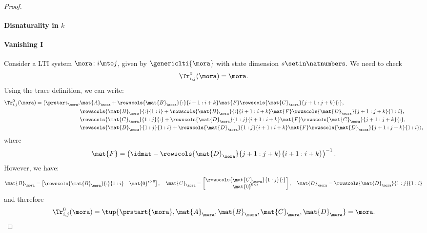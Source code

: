 {\begin{proof}
        \paragraph*{Disnaturality in $k$}

        \paragraph*{Vanishing I}
        Consider a LTI system $\mora\colon i\mto j$, given by $\genericlti{\mora}$ with state dimension $s\setin \natnumbers$.
        We need to check
        \begin{equation*}
            \Tr_{i,j}^0 (\mora)=\mora.
        \end{equation*}
        Using the trace definition, we can write:
        \begin{equation*}
            \begin{aligned}
                \Tr_{i,j}^0 (\mora)=\langle\prstart_{\mora}, & \mat{A}_\mora+\rowscols{\mat{B}_{\mora}}{:}{i+1:i+k}\mat{F}\rowscols{\mat{C}_{\mora}}{j+1:j+k}{:}, \\
                                                             & \rowscols{\mat{B}_{\mora}}{:}{1:i}+ \rowscols{\mat{B}_{\mora}}{:}{i+1:i+k}\mat{F}\rowscols{\mat{D}_{\mora}}{j+1:j+k}{1:i}, \\
                                                             & \rowscols{\mat{C}_{\mora}}{1:j}{:}+\rowscols{\mat{D}_{\mora}}{1:j}{i+1:i+k}\mat{F}\rowscols{\mat{C}_{\mora}}{j+1:j+k}{:}, \\
                                                             & \rowscols{\mat{D}_{\mora}}{1:j}{1:i}+ \rowscols{\mat{D}_{\mora}}{1:j}{i+1:i+k}\mat{F}\rowscols{\mat{D}_{\mora}}{j+1:j+k}{1:i}\rangle,
            \end{aligned}
        \end{equation*}
        where
        \begin{equation*}
            \mat{F}=\left(\idmat - \rowscols{\mat{D}_{\mora}}{j+1:j+k}{i+1:i+k}\right)^{-1}.
        \end{equation*}
        However, we have:
        \begin{equation*}
            \mat{B}_\mora=\begin{bmatrix}
                \rowscols{\mat{B}_{\mora}}{:}{1:i} & \mat{0}^{s\times 0}
            \end{bmatrix},\quad
            \mat{C}_\mora=\begin{bmatrix}
                \rowscols{\mat{C}_{\mora}}{1:j}{:} \\ \mat{0}^{0\times s}
            \end{bmatrix},
            \quad
            \mat{D}_\mora= \rowscols{\mat{D}_\mora}{1:j}{1:i}
        \end{equation*}
        and therefore
        \begin{equation*}
            \Tr_{i,j}^0 (\mora)=\tup{\prstart{\mora}, \mat{A}_\mora, \mat{B}_\mora, \mat{C}_\mora, \mat{D}_\mora}=\mora.
        \end{equation*}
    \end{proof}}

